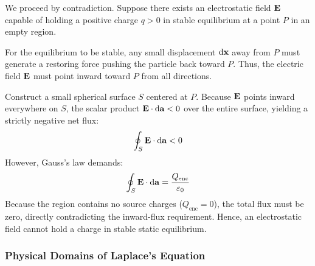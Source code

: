 \begin{proofbox}
We proceed by contradiction. Suppose there exists an electrostatic field $\vb{E}$ capable of holding a positive charge $q > 0$ in stable equilibrium at a point $P$ in an empty region.

For the equilibrium to be stable, any small displacement $\dd{\vb{x}}$ away from $P$ must generate a restoring force pushing the particle back toward $P$. Thus, the electric field $\vb{E}$ must point inward toward $P$ from all directions.

\begin{center}
\end{center}

Construct a small spherical surface $S$ centered at $P$. Because $\vb{E}$ points inward everywhere on $S$, the scalar product $\vb{E} \cdot \dd{\vb{a}} < 0$ over the entire surface, yielding a strictly negative net flux:
\begin{equation}
    \oint_S \vb{E} \cdot \dd{\vb{a}} < 0
\end{equation}
However, Gauss's law demands:
\begin{equation}
    \oint_S \vb{E} \cdot \dd{\vb{a}} = \frac{Q_{\text{enc}}}{\varepsilon_0}
\end{equation}
Because the region contains no source charges ($Q_{\text{enc}} = 0$), the total flux must be zero, directly contradicting the inward-flux requirement. Hence, an electrostatic field cannot hold a charge in stable static equilibrium.
\end{proofbox}

\subsubsection*{Physical Domains of Laplace's Equation}

